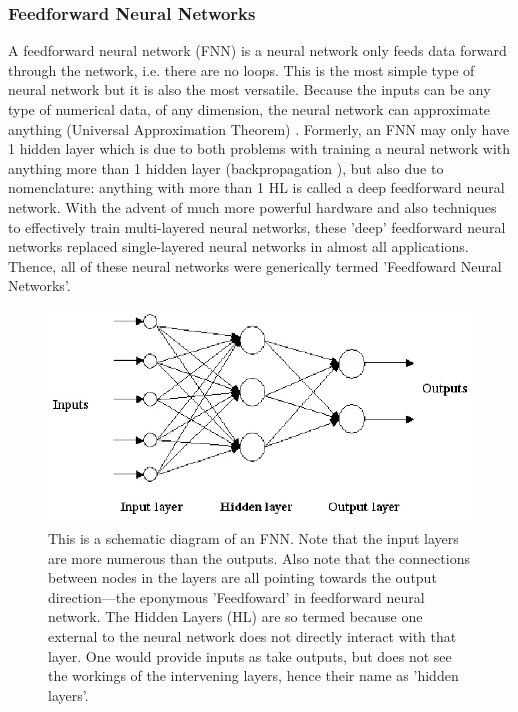 \documentclass[a4paper,fleqn,usenatbib]{mnras}
\begin{document}
\subsubsection{Feedforward Neural Networks}
A feedforward neural network (FNN) is a neural network only feeds data forward through the network, i.e. there are no loops. This is the most simple type of neural network but it is also the most versatile. Because the inputs can be any type of numerical data, of any dimension, the neural network can approximate anything (Universal Approximation Theorem) \cite{UniversalApproximationTheorem}. Formerly, an FNN may only have 1 hidden layer which is due to both problems with training a neural network with anything more than 1 hidden layer (backpropagation \cite{Backpropagation}), but also due to nomenclature: anything with more than 1 HL is called a deep feedforward neural network. With the advent of much more powerful hardware and also techniques to effectively train multi-layered neural networks, these 'deep' feedforward neural networks replaced single-layered neural networks in almost all applications. Thence, all of these neural networks were generically termed 'Feedfoward Neural Networks'.  \cite{FNN}

\begin{figure}
\includegraphics[width=\columnwidth]{../Figures/FNN_Diagram}
\caption{This is a schematic diagram of an FNN. Note that the input layers are more numerous than the outputs. Also note that the connections between nodes in the layers are all pointing towards the output direction---the eponymous 'Feedfoward' in feedforward neural network. The Hidden Layers (HL) are so termed because one external to the neural network does not directly interact with that layer. One would provide inputs as take outputs, but does not see the workings of the intervening layers, hence their name as 'hidden layers'. \protect\cite{FNN} \label{fig:FNN_Diagram} }
\end{figure}
\end{document}
